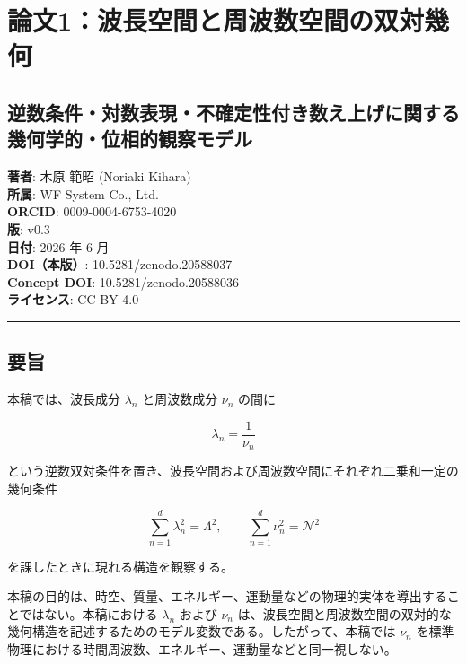 \documentclass[
]{ltjsarticle}
\author{}
\date{}
\begin{document}
\section{論文1：波長空間と周波数空間の双対幾何}\label{ux8ad6ux65871ux6ce2ux9577ux7a7aux9593ux3068ux5468ux6ce2ux6570ux7a7aux9593ux306eux53ccux5bfeux5e7eux4f55}

\subsection{逆数条件・対数表現・不確定性付き数え上げに関する幾何学的・位相的観察モデル}\label{ux9006ux6570ux6761ux4ef6ux5bfeux6570ux8868ux73feux4e0dux78baux5b9aux6027ux4ed8ux304dux6570ux3048ux4e0aux3052ux306bux95a2ux3059ux308bux5e7eux4f55ux5b66ux7684ux4f4dux76f8ux7684ux89b3ux5bdfux30e2ux30c7ux30eb}

\textbf{著者}: 木原 範昭 (Noriaki Kihara)\\
\textbf{所属}: WF System Co., Ltd.\\
\textbf{ORCID}: 0009-0004-6753-4020\\
\textbf{版}: v0.3\\
\textbf{日付}: 2026 年 6 月\\
\textbf{DOI（本版）}: 10.5281/zenodo.20588037\\
\textbf{Concept DOI}: 10.5281/zenodo.20588036\\
\textbf{ライセンス}: CC BY 4.0

\begin{center}\rule{0.5\linewidth}{0.5pt}\end{center}

\subsection{要旨}\label{ux8981ux65e8}

本稿では、波長成分 \(\lambda_n\) と周波数成分 \(\nu_n\) の間に

\[
\lambda_n=\frac{1}{\nu_n}
\]

という逆数双対条件を置き、波長空間および周波数空間にそれぞれ二乗和一定の幾何条件

\[
\sum_{n=1}^{d} \lambda_n^2=\Lambda^2,\qquad
\sum_{n=1}^{d} \nu_n^2=\mathcal{N}^2
\]

を課したときに現れる構造を観察する。

本稿の目的は、時空、質量、エネルギー、運動量などの物理的実体を導出することではない。本稿における
\(\lambda_n\) および \(\nu_n\)
は、波長空間と周波数空間の双対的な幾何構造を記述するためのモデル変数である。したがって、本稿では
\(\nu_n\)
を標準物理における時間周波数、エネルギー、運動量などと同一視しない。
\end{document}
